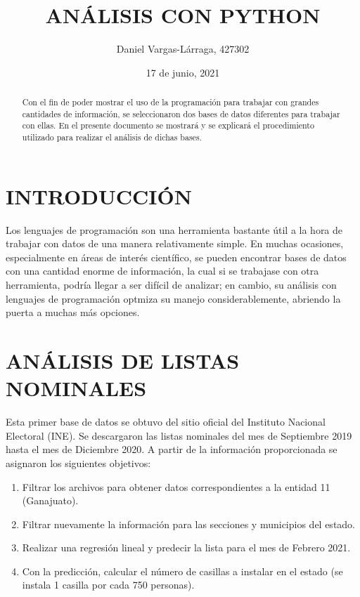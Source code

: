 \documentclass[12pt]{article}
\title{\textbf{ANÁLISIS CON PYTHON}}
\author[1]{Daniel Vargas-Lárraga, 427302}
\affil[1]{\small Licenciatura en Física, División de Ciencias e Ingenierías, Campus León, Universidad de Guanajuato, León 37150, México\vspace{-1em}}
\date{17 de junio, 2021\vspace{-2em}}
\begin{document}
\maketitle

\begin{abstract}\vspace{1em}

Con el fin de poder mostrar el uso de la programación para trabajar con grandes cantidades de información, se seleccionaron dos bases de datos diferentes para trabajar con ellas. En el presente documento se mostrará y se explicará el procedimiento utilizado para realizar el análisis de dichas bases.

\end{abstract}

\section{\large INTRODUCCIÓN}

Los lenguajes de programación son una herramienta bastante útil a la hora de trabajar con datos de una manera relativamente simple. En muchas ocasiones, especialmente en áreas de interés científico, se pueden encontrar bases de datos con una cantidad enorme de información, la cual si se trabajase con otra herramienta, podría llegar a ser difícil de analizar; en cambio, su análisis con lenguajes de programación optmiza su manejo considerablemente, abriendo la puerta a muchas más opciones.\\

\section{\large ANÁLISIS DE LISTAS NOMINALES}

Esta primer base de datos se obtuvo del sitio oficial del Instituto Nacional Electoral (INE). Se descargaron las listas nominales del mes de Septiembre 2019 hasta el mes de Diciembre 2020. A partir de la información proporcionada se asignaron los siguientes objetivos:

\begin{enumerate}
	\item Filtrar los archivos para obtener datos correspondientes a la entidad 11 (Ganajuato).
	\item Filtrar nuevamente la información para las secciones y municipios del estado.
	\item Realizar una regresión lineal y predecir la lista para el mes de Febrero 2021.
	\item Con la predicción, calcular el número de casillas a instalar en el estado (se instala 1 casilla por cada 750 personas).
\end{enumerate}
\end{document}
